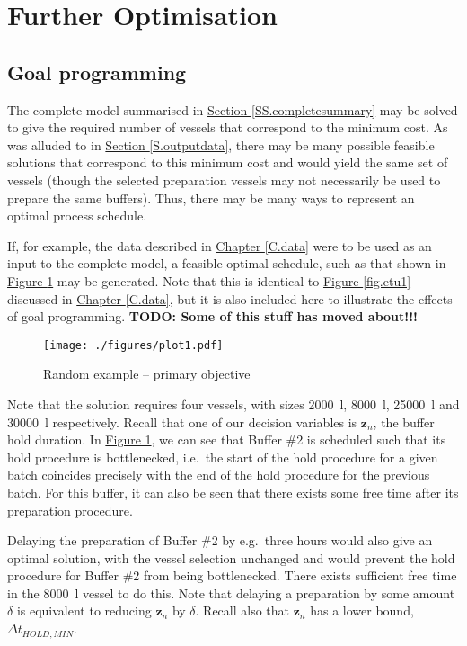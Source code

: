 \section{Further Optimisation}\label{S.secondary}

\subsection{Goal programming}\label{SS.goal}
The complete model summarised in 
\hyperref[SS.completesummary]{Section \ref*{SS.completesummary}} may be solved
to give the required number of vessels that correspond to the minimum cost.
As was alluded to in \hyperref[S.outputdata]{Section \ref*{S.outputdata}},
there may be many possible feasible solutions that correspond to this minimum
cost and would yield the same set of vessels (though the selected preparation
vessels may not necessarily be used to prepare the same buffers).
Thus, there may be many ways to represent an optimal process schedule.

If, for example, the data described in
\hyperref[C.data]{Chapter \ref*{C.data}} were to be used as an input to the
complete model, a feasible optimal schedule, such as that shown in
\hyperref[fig.primary]{Figure \ref*{fig.primary}} may be generated.
Note that this is identical to \hyperref[fig.etu1]{Figure \ref*{fig.etu1}}
discussed in \hyperref[C.data]{Chapter \ref*{C.data}},
but it is also included here to illustrate the effects of goal programming.
\textbf{TODO: Some of this stuff has moved about!!!}

\begin{figure}
    \centering
    \texttt{[image: ./figures/plot1.pdf]}
    \caption{Random example -- primary objective}
    \label{fig.primary}
\end{figure}
Note that the solution requires four vessels, with sizes
\SI{2000}{\litre}, \SI{8000}{\litre}, \SI{25000}{\litre} and \SI{30000}{\litre}
respectively.  
Recall that one of our decision variables is $\boldsymbol{z}_{n}$, the buffer
hold duration.
In \hyperref[fig.primary]{Figure \ref*{fig.primary}}, we can see that Buffer
\#2 is scheduled such that its hold procedure is bottlenecked, i.e.\ the start
of the hold procedure for a given batch coincides precisely with the end of the
hold procedure for the previous batch.
For this buffer, it can also be seen that there exists some free time after
its preparation procedure.

Delaying the preparation of Buffer \#2 by e.g.\ three hours would
also give an optimal solution, with the vessel selection unchanged and would
prevent the hold procedure for Buffer \#2 from being bottlenecked.
There exists sufficient free time in the \SI{8000}{\litre} vessel to do this.
Note that delaying a preparation by some amount $\delta$ is equivalent to 
reducing $\boldsymbol{z}_{n}$ by $\delta$.
Recall also that $\boldsymbol{z}_{n}$ has a lower bound, 
$\Delta t_{\mathit{HOLD,MIN}}$.

